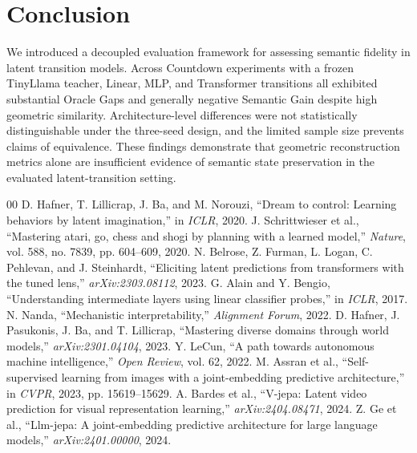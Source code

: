\documentclass[conference]{IEEEtran}
\begin{document}
\section{Conclusion}
We introduced a decoupled evaluation framework for assessing semantic fidelity in latent transition models. Across Countdown experiments with a frozen TinyLlama teacher, Linear, MLP, and Transformer transitions all exhibited substantial Oracle Gaps and generally negative Semantic Gain despite high geometric similarity. Architecture-level differences were not statistically distinguishable under the three-seed design, and the limited sample size prevents claims of equivalence. These findings demonstrate that geometric reconstruction metrics alone are insufficient evidence of semantic state preservation in the evaluated latent-transition setting.

\begin{thebibliography}{00}
 D. Hafner, T. Lillicrap, J. Ba, and M. Norouzi, ``Dream to control: Learning behaviors by latent imagination,'' in \textit{ICLR}, 2020.
 J. Schrittwieser et al., ``Mastering atari, go, chess and shogi by planning with a learned model,'' \textit{Nature}, vol. 588, no. 7839, pp. 604--609, 2020.
 N. Belrose, Z. Furman, L. Logan, C. Pehlevan, and J. Steinhardt, ``Eliciting latent predictions from transformers with the tuned lens,'' \textit{arXiv:2303.08112}, 2023.
 G. Alain and Y. Bengio, ``Understanding intermediate layers using linear classifier probes,'' in \textit{ICLR}, 2017.
 N. Nanda, ``Mechanistic interpretability,'' \textit{Alignment Forum}, 2022.
 D. Hafner, J. Pasukonis, J. Ba, and T. Lillicrap, ``Mastering diverse domains through world models,'' \textit{arXiv:2301.04104}, 2023.
 Y. LeCun, ``A path towards autonomous machine intelligence,'' \textit{Open Review}, vol. 62, 2022.
 M. Assran et al., ``Self-supervised learning from images with a joint-embedding predictive architecture,'' in \textit{CVPR}, 2023, pp. 15619--15629.
 A. Bardes et al., ``V-jepa: Latent video prediction for visual representation learning,'' \textit{arXiv:2404.08471}, 2024.
 Z. Ge et al., ``Llm-jepa: A joint-embedding predictive architecture for large language models,'' \textit{arXiv:2401.00000}, 2024.
\end{thebibliography}
\end{document}
